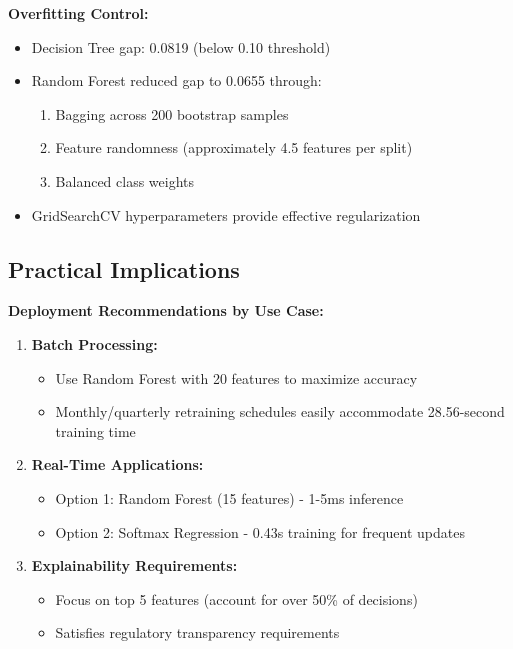 \documentclass[11pt, a4paper]{article}
\begin{document}
\textbf{Overfitting Control:}
\begin{itemize}
    \item Decision Tree gap: 0.0819 (below 0.10 threshold)
    \item Random Forest reduced gap to 0.0655 through:
    \begin{enumerate}
        \item Bagging across 200 bootstrap samples
        \item Feature randomness (approximately 4.5 features per split)
        \item Balanced class weights
    \end{enumerate}
    \item GridSearchCV hyperparameters provide effective regularization
\end{itemize}

\subsection{Practical Implications}

\textbf{Deployment Recommendations by Use Case:}
\begin{enumerate}
    \item \textbf{Batch Processing:}
    \begin{itemize}
        \item Use Random Forest with 20 features to maximize accuracy
        \item Monthly/quarterly retraining schedules easily accommodate 28.56-second training time
    \end{itemize}
    
    \item \textbf{Real-Time Applications:}
    \begin{itemize}
        \item Option 1: Random Forest (15 features) - 1-5ms inference
        \item Option 2: Softmax Regression - 0.43s training for frequent updates
    \end{itemize}
    
    \item \textbf{Explainability Requirements:}
    \begin{itemize}
        \item Focus on top 5 features (account for over 50\% of decisions)
        \item Satisfies regulatory transparency requirements
    \end{itemize}
\end{enumerate}
\end{document}
